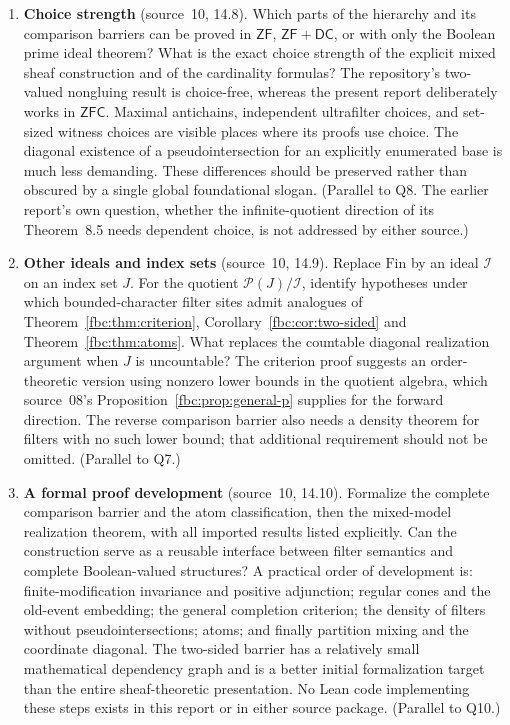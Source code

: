 \documentclass[11pt,letterpaper]{article}
\theoremstyle{definition}
\theoremstyle{remark}
\newcommand{\Fin}{\mathrm{Fin}}
\newcommand{\pow}{\mathcal P}
\newcommand{\ZFC}{\mathsf{ZFC}}
\begin{document}
\begin{enumerate}[label=\textbf{R\arabic*.},leftmargin=3em]
\item \textbf{Choice strength} (source~10, 14.8). Which parts of the
hierarchy and its comparison barriers can be proved in $\mathsf{ZF}$,
$\mathsf{ZF}+\mathsf{DC}$, or with only the Boolean prime ideal
theorem? What is the exact choice strength of the explicit mixed sheaf
construction and of the cardinality formulas? The repository's
two-valued nongluing result is choice-free, whereas the present report
deliberately works in $\ZFC$. Maximal antichains, independent ultrafilter
choices, and set-sized witness choices are visible places where its
proofs use choice. The diagonal existence of a pseudointersection for an
explicitly enumerated base is much less demanding. These differences
should be preserved rather than obscured by a single global foundational
slogan. (Parallel to Q8. The earlier report's own question, whether the
infinite-quotient direction of its Theorem~8.5 needs dependent choice,
is not addressed by either source.)

\item \textbf{Other ideals and index sets} (source~10, 14.9). Replace
$\Fin$ by an ideal $\mathcal I$ on an index set $J$. For the quotient
$\pow(J)/\mathcal I$, identify hypotheses under which bounded-character
filter sites admit analogues of Theorem~\ref{fbc:thm:criterion},
Corollary~\ref{fbc:cor:two-sided} and Theorem~\ref{fbc:thm:atoms}. What
replaces the countable diagonal realization argument when $J$ is
uncountable? The criterion proof suggests an order-theoretic version
using nonzero lower bounds in the quotient algebra, which source~08's
Proposition~\ref{fbc:prop:general-p} supplies for the forward direction.
The reverse comparison barrier also needs a density theorem for filters
with no such lower bound; that additional requirement should not be
omitted. (Parallel to Q7.)

\item \textbf{A formal proof development} (source~10, 14.10). Formalize
the complete comparison barrier and the atom classification, then the
mixed-model realization theorem, with all imported results listed
explicitly. Can the construction serve as a reusable interface between
filter semantics and complete Boolean-valued structures? A practical
order of development is: finite-modification invariance and positive
adjunction; regular cones and the old-event embedding; the general
completion criterion; the density of filters without
pseudointersections; atoms; and finally partition mixing and the
coordinate diagonal. The two-sided barrier has a relatively small
mathematical dependency graph and is a better initial formalization
target than the entire sheaf-theoretic presentation. No Lean code
implementing these steps exists in this report or in either source
package. (Parallel to Q10.)
\end{enumerate}
\end{document}

